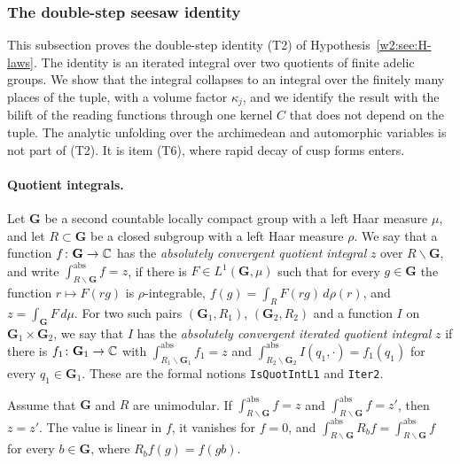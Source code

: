 \subsubsection{The double-step seesaw identity}\label{w3s:sec}

This subsection proves the double-step identity (T2) of Hypothesis~\ref{w2:see:H-laws}. The identity is an iterated integral over two quotients of finite adelic groups. We show that the integral collapses to an integral over the finitely many places of the tuple, with a volume factor $\kappa_j$, and we identify the result with the bilift of the reading functions through one kernel $C$ that does not depend on the tuple. The analytic unfolding over the archimedean and automorphic variables is not part of (T2). It is item (T6), where rapid decay of cusp forms enters.

\paragraph{Quotient integrals.} Let $\mathbf G$ be a second countable locally compact group with a left Haar measure $\mu$, and let $R\subset\mathbf G$ be a closed subgroup with a left Haar measure $\rho$. We say that a function $f\colon\mathbf G\to\mathbb C$ has the \emph{absolutely convergent quotient integral} $z$ over $R\backslash\mathbf G$, and write $\int^{\mathrm{abs}}_{R\backslash\mathbf G}f=z$, if there is $F\in L^1(\mathbf G,\mu)$ such that for every $g\in\mathbf G$ the function $r\mapsto F(rg)$ is $\rho$-integrable, $f(g)=\int_RF(rg)\,d\rho(r)$, and $z=\int_{\mathbf G}F\,d\mu$. For two such pairs $(\mathbf G_1,R_1)$, $(\mathbf G_2,R_2)$ and a function $I$ on $\mathbf G_1\times\mathbf G_2$, we say that $I$ has the \emph{absolutely convergent iterated quotient integral} $z$ if there is $f_1\colon\mathbf G_1\to\mathbb C$ with $\int^{\mathrm{abs}}_{R_1\backslash\mathbf G_1}f_1=z$ and $\int^{\mathrm{abs}}_{R_2\backslash\mathbf G_2}I(q_1,\cdot)=f_1(q_1)$ for every $q_1\in\mathbf G_1$. These are the formal notions \texttt{IsQuotIntL1} and \texttt{Iter2}.

\begin{lemma}[uniqueness]\label{w3s:lem:uniq}
Assume that $\mathbf G$ and $R$ are unimodular. If $\int^{\mathrm{abs}}_{R\backslash\mathbf G}f=z$ and $\int^{\mathrm{abs}}_{R\backslash\mathbf G}f=z'$, then $z=z'$. The value is linear in $f$, it vanishes for $f=0$, and $\int^{\mathrm{abs}}_{R\backslash\mathbf G}R_bf=\int^{\mathrm{abs}}_{R\backslash\mathbf G}f$ for every $b\in\mathbf G$, where $R_bf(g)=f(gb)$.
\end{lemma}

